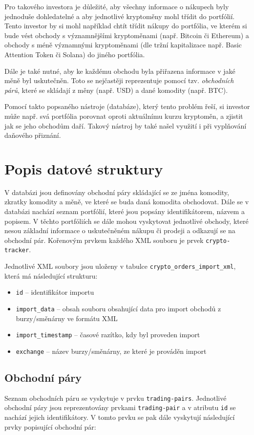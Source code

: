 \documentclass[12pt, a4paper]{article}
\let\oldsection\section
\renewcommand\section{\clearpage\oldsection}
\begin{document}
Pro takového investora je důležité, aby všechny informace o nákupech byly jednoduše dohledatelné a aby jednotlivé kryptoměny mohl třídit do portfólií. Tento investor by si mohl například chtít třídit nákupy do portfólia, ve kterém si bude vést obchody s významnějšími kryptoměnami (např. Bitcoin či Ethereum) a obchody s méně významnými kryptoměnami (dle tržní kapitalizace např. Basic Attention Token či Solana) do jiného portfólia.
    
Dále je také nutné, aby ke každému obchodu byla přiřazena informace v jaké měně byl uskutečněn. Toto se nejčastěji reprezentuje pomocí tzv. \textit{obchodních párů}, které se skládají z měny (např. USD) a dané komodity (např. BTC).

Pomocí takto popsaného nástroje (databáze), který tento problém řeší, si investor může např. svá portfólia porovnat oproti aktuálnímu kurzu kryptoměn, a zjistit jak se jeho obchodům daří. Takový nástroj by také našel využití i při vyplňování daňového přiznání.

\section{Popis datové struktury}

V databázi jsou definovány obchodní páry skládající se ze jména komodity, zkratky komodity a měně, ve které se buda daná komodita obchodovat. Dále se v databázi nachází seznam portfólií, které jsou popsány identifikátorem, názvem a popisem. V těchto portfóliích se dále mohou vyskytovat jednotlivé obchody, které nesou základní informace o uskutečněném nákupu či prodeji a odkazují se na obchodní pár. Kořenovým prvkem každého XML souboru je prvek \texttt{crypto-tracker}.

Jednotlivé XML soubory jsou uloženy v tabulce \texttt{crypto\_orders\_import\_xml}, která má následující strukturu:

\begin{itemize}
    \item \texttt{id} -- identifikátor importu
    \item \texttt{import\_data} -- obsah souboru obsahující data pro import obchodů z burzy/směnárny ve formátu XML
    \item \texttt{import\_timestamp} -- časové razítko, kdy byl proveden import
    \item \texttt{exchange} -- název burzy/směnárny, ze které je prováděn import
\end{itemize}


\subsection{Obchodní páry}
Seznam obchodních páru se vyskytuje v prvku \texttt{trading-pairs}. Jednotlivé obchodní páry jsou reprezentovány prvkami \texttt{trading-pair} a v atributu \texttt{id} se nachází jejich identifikátory. V tomto prvku se pak dále vyskytují následující prvky popisující obchodní pár:
\end{document}
